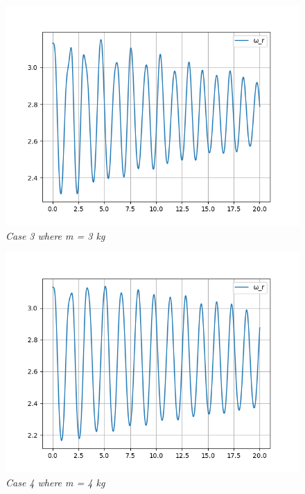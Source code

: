         \begin{figure}[H]
            \centering
            \includegraphics{Appendix/RSimPictures/F/fm3.png}
            \caption{\textit{Case 3 where m = 3 kg}}
            \label{}
        \end{figure}
            
        \begin{figure}[H]
            \centering
            \includegraphics{Appendix/RSimPictures/F/fm4.png}
            \caption{\textit{Case 4 where m = 4 kg}}
            \label{}
        \end{figure}
            
